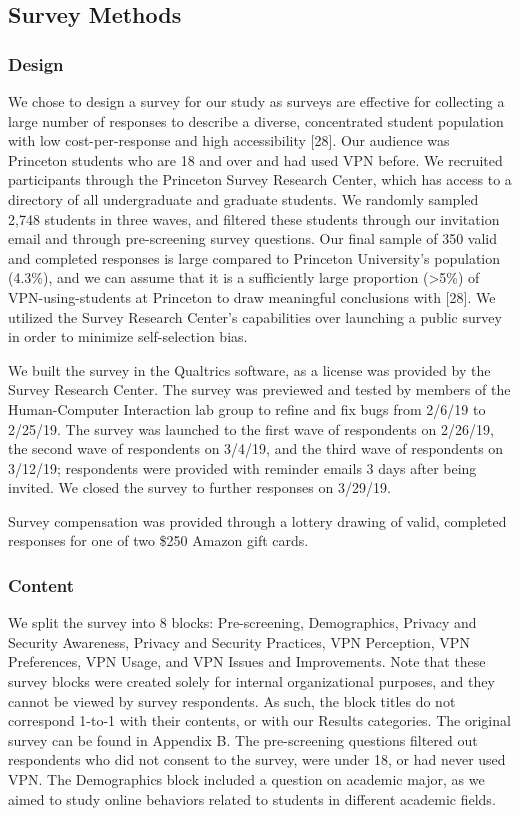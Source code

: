  \subsection{Survey Methods} 
 \subsubsection{Design}

We chose to design a survey for our study as surveys are effective for
collecting a large number of responses to describe a diverse, concentrated
student population with low cost-per-response and high accessibility [28]. Our
audience was Princeton students who are 18 and over and had used VPN before.
We recruited participants through the Princeton Survey Research Center, which
has access to a directory of all undergraduate and graduate students. We
randomly sampled 2,748 students in three waves, and filtered these students
through our invitation email and through pre-screening survey questions. Our
final sample of 350 valid and completed responses is large compared to
Princeton University's population (4.3\%), and we can assume that it is a
sufficiently large proportion (>5\%) of VPN-using-students at Princeton to
draw meaningful conclusions with [28]. We utilized the Survey Research
Center's capabilities over launching a public survey in order to minimize
self-selection bias.

We built the survey in the Qualtrics software, as a license was provided by
the Survey Research Center. The survey was previewed and tested by members of
the Human-Computer Interaction lab group to refine and fix bugs from 2/6/19 to
2/25/19. The survey was launched to the first wave of respondents on 2/26/19,
the second wave of respondents on 3/4/19, and the third wave of respondents on
3/12/19; respondents were provided with reminder emails 3 days after being
invited. We closed the survey to further responses on 3/29/19.

Survey compensation was provided through a lottery drawing of valid, completed
responses for one of two \$250 Amazon gift cards.

\subsubsection{Content}

We split the survey into 8 blocks: Pre-screening, Demographics, Privacy and
Security Awareness, Privacy and Security Practices, VPN Perception, VPN
Preferences, VPN Usage, and VPN Issues and Improvements. Note that these
survey blocks were created solely for internal organizational purposes, and
they cannot be viewed by survey respondents. As such, the block titles do not
correspond 1-to-1 with their contents, or with our Results categories. The
original survey can be found in Appendix B.  The pre-screening questions
filtered out respondents who did not consent to the survey, were under 18, or
had never used VPN. The Demographics block included a question on academic
major, as we aimed to study online behaviors related to students in different
academic fields.

